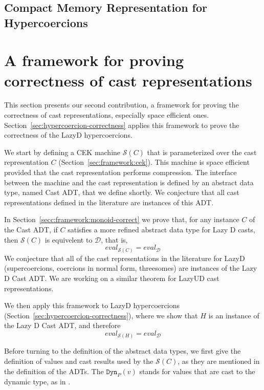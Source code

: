 \documentclass[acmsmall,review,anonymous]{acmart}\settopmatter{printfolios=true,printccs=false,printacmref=false}
\newcommand{\lazyUD}{Lazy\;UD}
\newcommand{\lazyD}{Lazy\;D}
\newcommand{\hcvOOinj}[2]{\mathtt{Dyn}_{#1}(#2)}
\newcommand{\ineffCEKD}{$\mathcal{D}$}
\newcommand{\effCEK}[1]{$\mathcal{S}(#1)$}
\newcommand{\evalEqv}[2]{\ensuremath{eval_{\text{#1}} = eval_{\text{#2}}}}
\begin{document}


\subsection{Compact Memory Representation for Hypercoercions}




\clearpage
\pagebreak

\section{A framework for proving correctness of cast representations}
\label{sec:framework}

This section presents our second contribution, a framework for proving
the correctness of cast representations, especially space efficient
ones. Section~\ref{sec:hypercoercion-correctness} applies this
framework to prove the correctness of the \lazyD{} hypercoercions.

We start by defining a CEK machine \effCEK{C} that is parameterized
over the cast representation $C$
(Section~\ref{sec:framework:cek}). This machine is space efficient
provided that the cast representation performs compression.  The
interface between the machine and the cast representation is defined
by an abstract data type, named Cast ADT, that we define shortly.  We
conjecture that all cast representations defined in the literature
are instances of this ADT.

In Section~\ref{secc:framework:monoid-correct} we prove that, for any
instance $C$ of the Cast ADT, if $C$ satisfies a more refined abstract
data type for Lazy D casts, then \effCEK{C} is equivelent to
\ineffCEKD{}, that is,
\[
  \evalEqv{\effCEK{C}}{\ineffCEKD}
\]
We conjecture that all of the cast representations in the literature
for \lazyD{} (supercoercions, coercions in normal form, threesomes)
are instances of the Lazy D Cast ADT.  We are working on a similar
theorem for \lazyUD{} cast representations.

We then apply this framework to \lazyD{} hypercoercions
(Section~\ref{sec:hypercoercion-correctness}), where we show that $H$
is an instance of the Lazy D Cast ADT, and therefore
\[
  \evalEqv{\effCEK{H}}{\ineffCEKD}
\]

Before turning to the definition of the abstract data types, we first
give the definition of values and cast results used by the \effCEK{C}, as they 
are mentioned in the definition of the ADTs. The $\hcvOOinj{P}{v}$ stands for 
values that are cast to the dynamic type, as in \citet{wadler2009well}.
\end{document}
